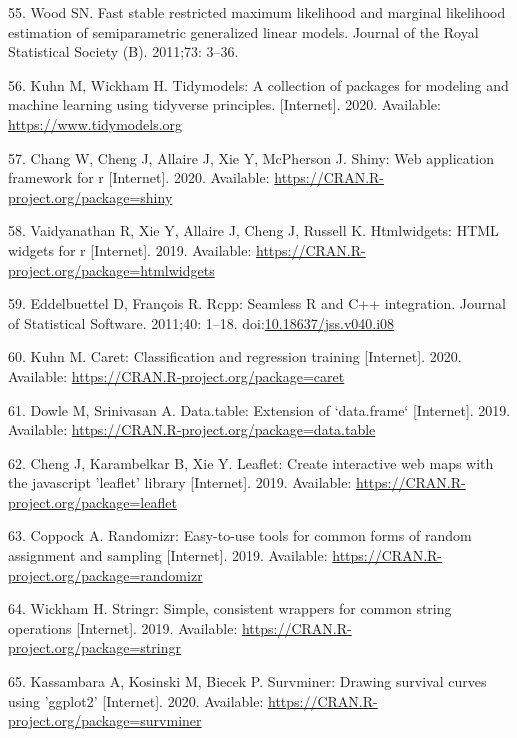 \documentclass[10pt,letterpaper]{article}
\begin{document}
\leavevmode\hypertarget{ref-mgcv}{}%
55. Wood SN. Fast stable restricted maximum likelihood and marginal
likelihood estimation of semiparametric generalized linear models.
Journal of the Royal Statistical Society (B). 2011;73: 3--36.

\leavevmode\hypertarget{ref-tidymodels}{}%
56. Kuhn M, Wickham H. Tidymodels: A collection of packages for modeling
and machine learning using tidyverse principles. {[}Internet{]}. 2020.
Available: \url{https://www.tidymodels.org}

\leavevmode\hypertarget{ref-shiny}{}%
57. Chang W, Cheng J, Allaire J, Xie Y, McPherson J. Shiny: Web
application framework for r {[}Internet{]}. 2020. Available:
\url{https://CRAN.R-project.org/package=shiny}

\leavevmode\hypertarget{ref-htmlwidgets}{}%
58. Vaidyanathan R, Xie Y, Allaire J, Cheng J, Russell K. Htmlwidgets:
HTML widgets for r {[}Internet{]}. 2019. Available:
\url{https://CRAN.R-project.org/package=htmlwidgets}

\leavevmode\hypertarget{ref-Rcpp}{}%
59. Eddelbuettel D, François R. Rcpp: Seamless R and C++ integration.
Journal of Statistical Software. 2011;40: 1--18.
doi:\href{https://doi.org/10.18637/jss.v040.i08}{10.18637/jss.v040.i08}

\leavevmode\hypertarget{ref-caret}{}%
60. Kuhn M. Caret: Classification and regression training
{[}Internet{]}. 2020. Available:
\url{https://CRAN.R-project.org/package=caret}

\leavevmode\hypertarget{ref-datatable}{}%
61. Dowle M, Srinivasan A. Data.table: Extension of `data.frame`
{[}Internet{]}. 2019. Available:
\url{https://CRAN.R-project.org/package=data.table}

\leavevmode\hypertarget{ref-leaflet}{}%
62. Cheng J, Karambelkar B, Xie Y. Leaflet: Create interactive web maps
with the javascript 'leaflet' library {[}Internet{]}. 2019. Available:
\url{https://CRAN.R-project.org/package=leaflet}

\leavevmode\hypertarget{ref-randomizr}{}%
63. Coppock A. Randomizr: Easy-to-use tools for common forms of random
assignment and sampling {[}Internet{]}. 2019. Available:
\url{https://CRAN.R-project.org/package=randomizr}

\leavevmode\hypertarget{ref-stringr}{}%
64. Wickham H. Stringr: Simple, consistent wrappers for common string
operations {[}Internet{]}. 2019. Available:
\url{https://CRAN.R-project.org/package=stringr}

\leavevmode\hypertarget{ref-survminer}{}%
65. Kassambara A, Kosinski M, Biecek P. Survminer: Drawing survival
curves using 'ggplot2' {[}Internet{]}. 2020. Available:
\url{https://CRAN.R-project.org/package=survminer}
\end{document}
